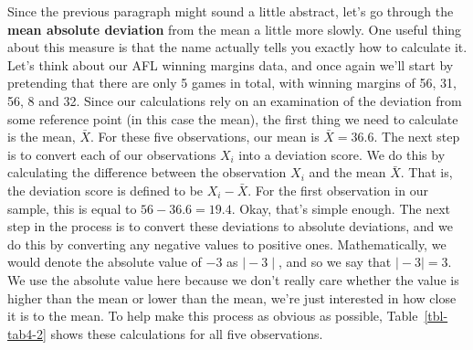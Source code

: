 \documentclass[
  a4paper,
]{book}
\begin{document}
Since the previous paragraph might sound a little abstract, let's go
through the \textbf{mean absolute deviation} from the mean a little more
slowly. One useful thing about this measure is that the name actually
tells you exactly how to calculate it. Let's think about our AFL winning
margins data, and once again we'll start by pretending that there are
only 5 games in total, with winning margins of 56, 31, 56, 8 and 32.
Since our calculations rely on an examination of the deviation from some
reference point (in this case the mean), the first thing we need to
calculate is the mean, \(\bar{X}\). For these five observations, our
mean is \(\bar{X} = 36.6\). The next step is to convert each of our
observations \(X_i\) into a deviation score. We do this by calculating
the difference between the observation \(X_i\) and the mean \(\bar{X}\).
That is, the deviation score is defined to be \(X_i - \bar{X}\). For the
first observation in our sample, this is equal to \(56 - 36.6 = 19.4\).
Okay, that's simple enough. The next step in the process is to convert
these deviations to absolute deviations, and we do this by converting
any negative values to positive ones. Mathematically, we would denote
the absolute value of \(-3\) as \(\mid -3 \mid\), and so we say that
\(\mid -3 \mid = 3\). We use the absolute value here because we don't
really care whether the value is higher than the mean or lower than the
mean, we're just interested in how close it is to the mean. To help make
this process as obvious as possible, Table~\ref{tbl-tab4-2} shows these
calculations for all five observations.

\hypertarget{tbl-tab4-2}{}
 
  \providecommand{\huxb}[2]{\arrayrulecolor[RGB]{#1}\global\arrayrulewidth=#2pt}
  \providecommand{\huxvb}[2]{\color[RGB]{#1}\vrule width #2pt}
  \providecommand{\huxtpad}[1]{\rule{0pt}{#1}}
  \providecommand{\huxbpad}[1]{\rule[-#1]{0pt}{#1}}
\end{document}
